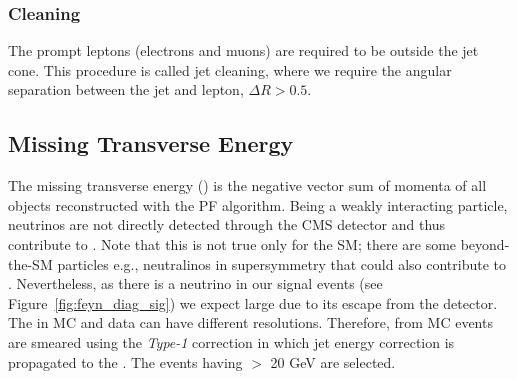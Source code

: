 \subsubsection{Cleaning}
The prompt leptons (electrons and muons) are required to be outside the jet cone.
This procedure is called jet cleaning, where we require the angular separation between the
jet and lepton, $\Delta R > 0.5$.

\subsection{Missing Transverse Energy}
The missing transverse energy (\MET) is the negative vector sum of momenta of all objects
reconstructed with the PF algorithm.
Being a weakly interacting particle, neutrinos are not directly detected through the CMS
detector and thus contribute to \MET.
Note that this is not true only for the SM; there are some beyond-the-SM particles e.g.,
neutralinos in supersymmetry that could also contribute to \MET.
Nevertheless, as there is a neutrino in our signal events (see Figure~\ref{fig:feyn_diag_sig})
we expect large \MET due to its escape from the detector.
The \MET in MC and data can have different resolutions.
Therefore, \MET from MC events are smeared using the {\em Type-1} correction in which jet energy
correction is propagated to the \MET.
The events having \MET $>$ 20 GeV are selected.
